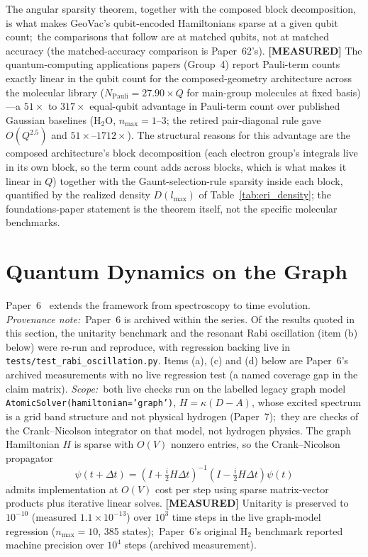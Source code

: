 \documentclass[aps,pra,twocolumn,superscriptaddress,longbibliography]{revtex4-2}
\newcommand{\gvq}[2]{#2}
\newcommand{\gvc}[2]{#2}
\begin{document}
The angular sparsity theorem, together with the composed block
decomposition, is what makes GeoVac's qubit-encoded Hamiltonians
sparse at a given qubit count;\ the comparisons that follow are at matched qubits, not at
matched accuracy (the matched-accuracy comparison is Paper~62's).
\textbf{[MEASURED]} The
quantum-computing applications papers (Group~4) report Pauli-term
counts exactly linear in the qubit count for the composed-geometry
architecture across the molecular library
($N_{\mathrm{Pauli}} = \gvq{composed_coeff}{27.90} \times Q$ for main-group molecules at fixed basis)---a
$51\times$ to $317\times$ equal-qubit advantage in Pauli-term count
over published Gaussian baselines (H$_2$O, $n_{\max} = 1$--$3$; the
retired pair-diagonal rule gave $O(Q^{2.5})$ and
$51\times$--$1712\times$).  The structural reasons for this advantage are
the composed architecture's block decomposition (each electron group's
integrals live in its own block, so the term count adds across blocks,
which is what makes it linear in $Q$) together with the
Gaunt-selection-rule sparsity inside each block, quantified by the realized density
$D(l_{\max})$ of Table~\ref{tab:eri_density};
the foundations-paper statement is the theorem itself, not the
specific molecular benchmarks.

\section{Quantum Dynamics on the Graph}
\label{sec:dynamics}

Paper~6~\cite{loutey_paper6} extends the framework from spectroscopy
to time evolution.  \emph{Provenance note:}\ Paper~6 is archived
within the series.  Of the results quoted in this section, the
unitarity benchmark and the resonant Rabi oscillation (item (b)
below) were re-run and reproduce, with regression backing live in
\texttt{tests/test\_rabi\_oscillation.py}.
Items (a), (c) and (d) below are Paper~6's archived measurements with
no live regression test (a named coverage gap in the claim matrix).
\emph{Scope:}\ both live checks run on the labelled legacy graph model
\texttt{AtomicSolver(hamiltonian='graph')}, $H = \kappa(D - A)$, \gvc{graph-s3-wall}{whose
excited spectrum is a grid band structure and not physical hydrogen
(Paper~7)};\ they are checks of the Crank--Nicolson integrator on that
model, not hydrogen physics.  The graph Hamiltonian $H$ is
sparse with $O(V)$
nonzero entries, so the Crank--Nicolson propagator
\begin{equation}
\psi(t + \Delta t) = \left( I + \tfrac{i}{2} H \Delta t \right)^{-1}
\left( I - \tfrac{i}{2} H \Delta t \right) \psi(t)
\end{equation}
admits implementation at $O(V)$ cost per step using sparse
matrix-vector products plus iterative linear solves.  \textbf{[MEASURED]} Unitarity is
preserved to $10^{-10}$ (measured $1.1 \times 10^{-13}$) over $10^3$
time steps in the live graph-model regression ($n_{\max} = 10$, 385 states);\ Paper~6's original
$\mathrm{H}_2$ benchmark reported machine precision over $10^4$ steps
(archived measurement).
\end{document}
